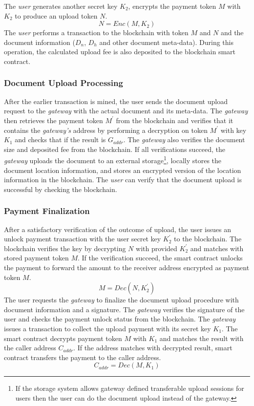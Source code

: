 The {\it user} generates another secret key $K_2$, encrypts the payment token $M$ with $K_2$ to produce an upload token $N$.
\begin{equation}
\label{eq-u-3}
N = Enc (M, K_2)
\end{equation}
The {\it user} performs a transaction to the blockchain with token $M$ and $N$ and the document information ($D_{n}$, $D_{h}$ and other document meta-data). During this operation, the calculated upload fee is also deposited to the blockchain smart contract.
 
\subsubsection{Document Upload Processing}
After the earlier transaction is mined, the user sends the document upload request to the {\it gateway} with the actual document and its meta-data. The {\it gateway} then retrieves the payment token $M^\prime$ from the blockchain and verifies that it contains the {\it gateway's} address by performing a decryption on token $M^\prime$ with key $K_1$ and checks that if the result is $G_{addr}$. The {\it gateway} also verifies the document size and deposited fee from the blockchain. If all verifications succeed, the {\it gateway} uploads the document to an external storage\footnote{If the storage system allows gateway defined transferable upload sessions for users then the user can do the document upload instead of the gateway.}, locally stores the document location information, and stores an encrypted version of the location information in the blockchain. The {\it user} can verify that the document  upload is successful by checking the blockchain. 

\subsubsection{Payment Finalization}
After a satisfactory verification of the outcome of upload, the user issues an unlock payment transaction with the user secret key $K_2^\prime$ to the blockchain. The blockchain verifies the key by decrypting $N$ with provided $K_2^\prime$ and matches with stored payment token $M$. If the verification succeed, the smart contract unlocks the payment to forward the amount to the receiver address encrypted as payment token $M$.
\begin{equation}
\label{eq-u-5}
M = Dec (N, K_2^\prime)
\end{equation}
The user requests the {\it gateway} to finalize the document upload procedure with document information and a signature. The {\it gateway} verifies the signature of the user and checks the payment unlock status from the blockchain. The {\it gateway} issues a transaction to collect the upload payment with its secret key $K_1$. The smart contract decrypts payment token $M$ with $K_1$ and matches the result with the caller address $C_{addr}$. If the address matches with decrypted result, smart contract transfers the payment to the caller  address.
\begin{equation}
\label{eq-u-6}
C_{addr} = Dec (M, K_1)
\end{equation}


